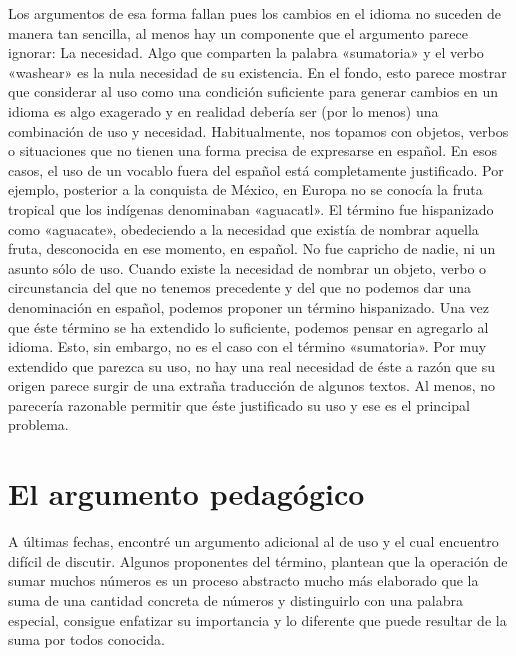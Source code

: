 \documentclass[draft,letter,10pt,notitlepage]{article}
\theoremstyle{definition}
\theoremstyle{remark}
\begin{document}
Los argumentos de esa forma fallan pues los cambios en el idioma no
suceden de manera tan sencilla, al menos hay un componente que el
argumento parece ignorar: La necesidad. Algo que comparten la palabra
«sumatoria» y el verbo «washear» es la nula necesidad de su existencia.
En el fondo, esto parece mostrar que considerar al uso como una
condición suficiente para generar cambios en un idioma es algo
exagerado y en realidad debería ser (por lo menos) una combinación de
uso y necesidad. Habitualmente, nos topamos con objetos, verbos o
situaciones que no tienen una forma precisa de expresarse en
español. En esos casos, el uso de un vocablo fuera del español está
completamente justificado. Por ejemplo, posterior a la conquista de
México, en Europa no se conocía la fruta tropical que los indígenas
denominaban «aguacatl». El término fue hispanizado como «aguacate»,
obedeciendo a la necesidad que existía de nombrar aquella fruta,
desconocida en ese momento, en español. No fue capricho de nadie, ni
un asunto sólo de uso. Cuando existe la necesidad de nombrar un
objeto, verbo o circunstancia del que no tenemos precedente y del
que no podemos dar una denominación en español, podemos proponer un
término hispanizado. Una vez que éste término se ha extendido lo
suficiente, podemos pensar en agregarlo al idioma. Esto, sin embargo,
no es el caso con el término «sumatoria». Por muy extendido que
parezca su uso, no hay una real necesidad de éste a razón que su
origen parece surgir de una extraña traducción de algunos textos.
Al menos, no parecería razonable permitir que éste justificado su uso
y ese es el principal problema.

\section{El argumento pedagógico}
A últimas fechas, encontré un argumento adicional al de uso y el cual
encuentro difícil de discutir. Algunos proponentes del término,
plantean que la operación de sumar muchos números es un
proceso abstracto mucho más elaborado que la suma de una cantidad
concreta de números y distinguirlo con una palabra
especial, consigue enfatizar su importancia y lo diferente que puede
resultar de la suma por todos conocida.
\end{document}
